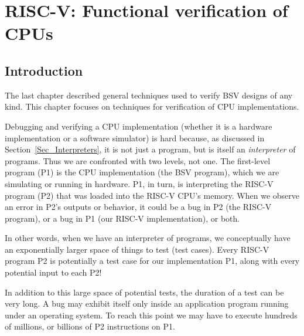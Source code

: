 

\chapter{RISC-V: Functional verification of CPUs}


\setcounter{page}{1}
\renewcommand{\thepage}{\arabic{chapter}-\arabic{page}}

\label{ch_RISCV_verification}


\section{Introduction}

\label{Sec_RISCV_verification_intro}

The last chapter described general techniques used to verify BSV
designs of any kind.  This chapter focuses on techniques for
verification of CPU implementations.

Debugging and verifying a CPU implementation (whether it is a hardware
implementation or a software simulator) is hard because, as discussed
in Section~\ref{Sec_Interpreters}, it is not just a program, but is
itself an \emph{interpreter} of programs.  Thus we are confronted with
two levels, not one.  The first-level program (P1) is the CPU
implementation (the BSV program), which we are simulating or running
in hardware.  P1, in turn, is interpreting the RISC-V program (P2)
that was loaded into the RISC-V CPU's memory. When we observe an error
in P2's outputs or behavior, it could be a bug in P2 (the RISC-V
program), or a bug in P1 (our RISC-V implementation), or both.

In other words, when we have an interpreter of programs, we
conceptually have an exponentially larger space of things to test
(test cases).  Every RISC-V program P2 is potentially a test case for
our implementation P1, along with every potential input to each P2!

In addition to this large space of potential tests, the duration of a
test can be very long.  A bug may exhibit itself only inside an
application program running under an operating system.  To reach this
point we may have to execute hundreds of millions, or billions of P2
instructions on P1.

